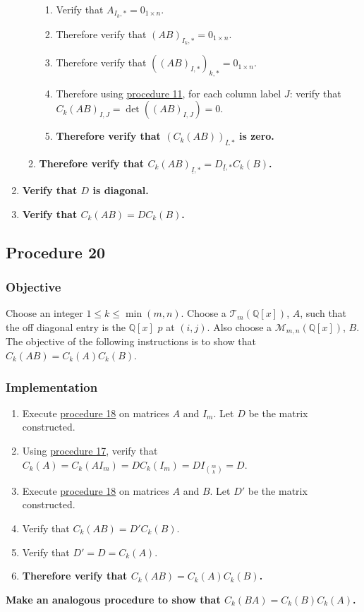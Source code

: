 \documentclass[twocolumn]{article}
\newcommand{\ul}[1]{\underline{#1}}
\newcommand{\procedure}[2][]{\subsection*{Procedure #2 \ifthenelse{\equal{#1}{}}{}{(#1)}}\label{sec:procedure #2}}
\newcommand{\objective}{\subsubsection*{Objective}}
\newcommand{\implementation}{\subsubsection*{Implementation}}
\begin{document}
\begin{enumerate}
\begin{enumerate}
\begin{enumerate}
							\item Verify that $A_{I_k,*}=0_{1\times n}$.
							\item Therefore verify that $(AB)_{I_k,*}=0_{1\times n}$.
							\item Therefore verify that $((AB)_{I,*})_{k,*}=0_{1\times n}$.
							\item Therefore using \hyperref[sec:procedure 11]{procedure 11}, for each column label $J$: verify that ${C_k(AB)}_{I,J}=\det((AB)_{I,J})=0$.
							\item \textbf{Therefore verify that $(C_k(AB))_{\ul{I},*}$ is zero.}
						\end{enumerate}
						\item \textbf{Therefore verify that ${C_k(AB)}_{\ul{I},*}=D_{\ul{I},*}C_k(B)$.}
					\end{enumerate}
					\item \textbf{Verify that $D$ is diagonal.}
					\item \textbf{Verify that $C_k(AB)=DC_k(B)$.}
				\end{enumerate}
		\procedure{20}
			\objective
				Choose an integer $1\le k\le\min(m,n)$. Choose a $\mathcal{T}_{m}(\mathbb{Q}[x])$, $A$, such that the off diagonal entry is the $\mathbb{Q}[x]$ $p$ at $(i,j)$. Also choose a $\mathcal{M}_{m,n}(\mathbb{Q}[x])$, $B$. The objective of the following instructions is to show that $C_k(AB)=C_k(A)C_k(B)$.
			\implementation
				\begin{enumerate}
					\item Execute \hyperref[sec:procedure 18]{procedure 18} on matrices $A$ and $I_m$. Let $D$ be the matrix constructed.
					\item Using \hyperref[sec:procedure 17]{procedure 17}, verify that $C_k(A)=C_k(AI_m)=DC_k(I_m)=DI_{\binom{m}{k}}=D$.
					\item Execute \hyperref[sec:procedure 18]{procedure 18} on matrices $A$ and $B$. Let $D'$ be the matrix constructed.
					\item Verify that $C_k(AB)=D'C_k(B)$.
					\item Verify that $D'=D=C_k(A)$.
					\item \textbf{Therefore verify that $C_k(AB)=C_k(A)C_k(B)$.}
				\end{enumerate}
			\textbf{Make an analogous procedure to show that $C_k(BA)=C_k(B)C_k(A)$.}
			
\end{document}
